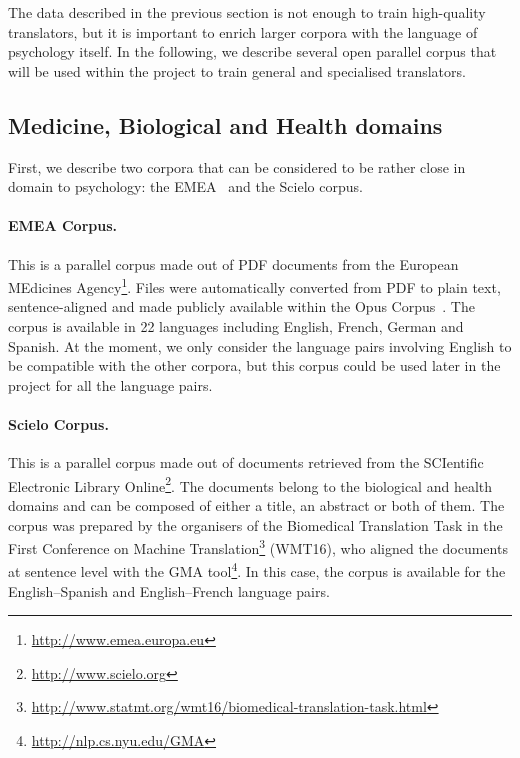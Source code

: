 \documentclass[a4paper,11pt]{article}
\begin{document}
The data described in the previous section is not enough to train high-quality translators, but it is important to enrich larger corpora with the language of psychology itself. In the following, we describe several open parallel corpus that will be used within the project to train general and specialised translators.

\subsection{Medicine, Biological and Health domains}

First, we describe two corpora that can be considered to be rather close in domain to psychology: the EMEA~\cite{tiedemann:2009} and the Scielo corpus.

\paragraph{EMEA Corpus.}
This is a parallel corpus made out of PDF documents from the European MEdicines Agency\footnote{\url{http://www.emea.europa.eu}}. Files were automatically converted from PDF to plain text, sentence-aligned and made publicly available within the Opus Corpus~\cite{tiedemann:2009}. The corpus is available in 22 languages including English, French, German and Spanish. At the moment, we only consider the language pairs involving English to be compatible with the other corpora, but this corpus could be used later in the project for all the language pairs.

\paragraph{Scielo Corpus.}
This is a parallel corpus made out of documents retrieved from the SCIentific Electronic Library Online\footnote{\url{http://www.scielo.org}}. The documents belong to the biological and health domains and can be composed of either a title, an abstract or both of them. The corpus was prepared by the organisers of the Biomedical Translation Task in the First Conference on Machine Translation\footnote{\url{http://www.statmt.org/wmt16/biomedical-translation-task.html}} (WMT16), who aligned the documents at sentence level with the GMA tool\footnote{\url{http://nlp.cs.nyu.edu/GMA}}. In this case, the corpus is available for the English--Spanish and English--French language pairs.
\end{document}
